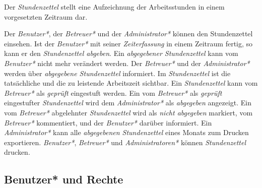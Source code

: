\begin{requirements}
\newpage
    Der \emph{Stundenzettel} stellt eine Aufzeichnung der Arbeitsstunden in einem vorgesetzten Zeitraum dar.
    \begin{requirements}
         Der \emph{Benutzer*}, der \emph{Betreuer*} und der \emph{Administrator*} können den Stundenzettel einsehen.
         Ist der \emph{Benutzer*} mit seiner \emph{Zeiterfassung} in einem Zeitraum fertig, so kann er den \emph{Stundenzettel abgeben}.
         Ein \emph{abgegebener Stundenzettel} kann vom \emph{Benutzer*} nicht mehr verändert werden.
         Der \emph{Betreuer*} und der \emph{Administrator*} werden über \emph{abgegebene Stundenzettel} informiert.
         Im \emph{Stundenzettel} ist die tatsächliche und die zu leistende Arbeitszeit sichtbar.
         Ein \emph{Stundenzettel} kann vom \emph{Betreuer*} als \emph{geprüft} eingestuft werden.
         Ein vom \emph{Betreuer*} als \emph{geprüft} eingestufter \emph{Stundenzettel} wird dem \emph{Administrator*} als \emph{abgegeben} angezeigt.
         Ein vom \emph{Betreuer*} abgelehnter \emph{Stundenzettel} wird als \emph{nicht abgegeben} markiert, vom \emph{Betreuer*} kommentiert, und der \emph{Benutzer*} darüber informiert.
         Ein \emph{Administrator*} kann alle \emph{abgegebenen Stundenzettel} eines Monats zum Drucken exportieren.
        \emph{Benutzer*}, \emph{Betreuer*} und \emph{Administratoren*} können \emph{Stundenzettel} drucken.
    \end{requirements}

\end{requirements}

\subsection{Benutzer* und Rechte}

